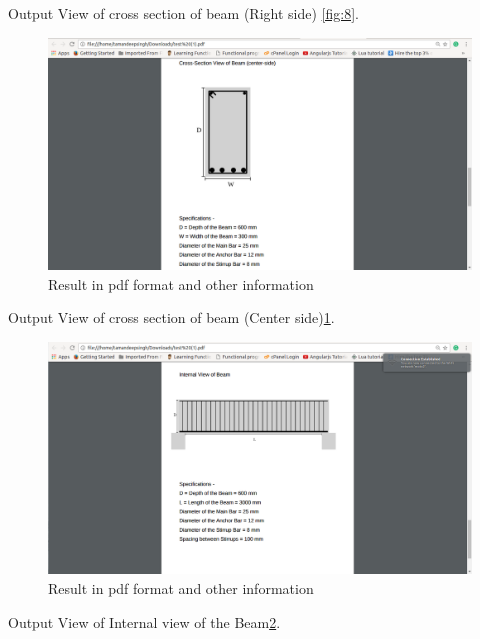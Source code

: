 Output View of cross section of beam (Right side) \ref{fig:8}.

\begin{figure}[H] 
\centering \includegraphics[scale=0.31]{images/output/screen9.png}
\caption{Result in pdf format and other information}
\label{fig:9}
\end{figure}

Output View of cross section of beam (Center side)\ref{fig:9}.

\begin{figure}[H] 
\centering \includegraphics[scale=0.31]{images/output/screen10.png}
\caption{Result in pdf format and other information}
\label{fig:10}
\end{figure}

Output View of Internal view of the Beam\ref{fig:10}.
